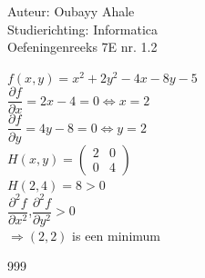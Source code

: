 \documentclass[a4paper]{article}
\begin{document}
\noindent \large Auteur: Oubayy Ahale       \\
\noindent \large Studierichting: Informatica\\
\noindent \large Oefeningenreeks 7E nr. 1.2 \\

\medskip

\normalsize

$ f(x,y) = x^2 +2y^2 - 4x -8y -5                                    $\\

$ \dfrac{\partial f}{\partial x} = 2x - 4 = 0 \Leftrightarrow x = 2 $\\

$ \dfrac{\partial f}{\partial y} = 4y - 8 = 0 \Leftrightarrow y = 2 $\\

$H(x,y) = \left(\begin{array}{cc}
	2 & 0 \\
	0 & 4 
\end{array}\right) $\\

$ H(2,4) = 8 > 0   $\\

$ \dfrac{\partial^2 f}{ \partial x^2}$,$\dfrac{\partial^2 f}{\partial y^2} > 0 $\\ 

$\Rightarrow (2,2)$ is een minimum\\

\begin{thebibliography}{999}
\end{thebibliography}
\end{document}
